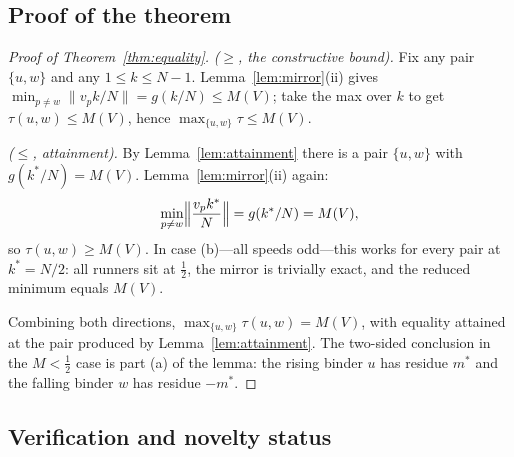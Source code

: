 \documentclass[11pt,a4paper]{article}
\numberwithin{equation}{section}
\theoremstyle{plain}
\theoremstyle{plain}
\theoremstyle{definition}
\theoremstyle{remark}
\begin{document}
\subsection{Proof of the theorem}

\begin{proof}[Proof of Theorem~\ref{thm:equality}]
\emph{($\ge$, the constructive bound).} Fix any pair $\{u,w\}$ and any
$1\le k\le N-1$. Lemma~\ref{lem:mirror}(ii) gives
$\min_{p\ne w}\lVert v_p k/N\rVert=g(k/N)\le M(V)$; take the max over
$k$ to get $\tau(u,w)\le M(V)$, hence
$\max_{\{u,w\}}\tau\le M(V)$.

\emph{($\le$, attainment).} By Lemma~\ref{lem:attainment} there is a pair
$\{u,w\}$ with $g(k^\ast/N)=M(V)$. Lemma~\ref{lem:mirror}(ii) again:
\[
\min_{p\ne w}\Bigl\lVert \frac{v_p k^\ast}{N}\Bigr\rVert
=g(k^\ast/N)=M(V),
\]
so $\tau(u,w)\ge M(V)$. In case (b)---all speeds odd---this works for
every pair at $k^\ast=N/2$: all runners sit at $\tfrac12$, the mirror is
trivially exact, and the reduced minimum equals $M(V)$.

Combining both directions, $\max_{\{u,w\}}\tau(u,w)=M(V)$, with equality
attained at the pair produced by Lemma~\ref{lem:attainment}. The
two-sided conclusion in the $M<\tfrac12$ case is part (a) of the lemma:
the rising binder $u$ has residue $m^\ast$ and the falling binder $w$ has
residue $-m^\ast$.
\end{proof}

\subsection{Verification and novelty status}\label{sec:equality-verify}
\end{document}
